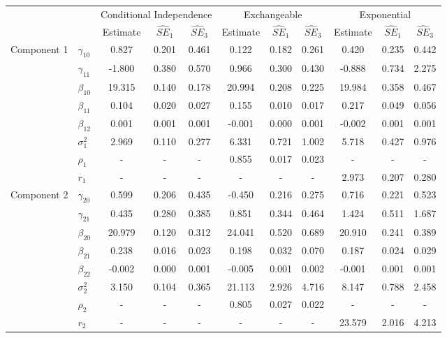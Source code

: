 \begin{table}[ht]
\begin{center}
\begin{tabular}{llccccccccc}
  \hline&&\multicolumn{3}{c}{Conditional Independence}&\multicolumn{3}{c}{Exchangeable}&\multicolumn{3}{c}{Exponential}\\&&Estimate&$\widehat{SE}_1$&$\widehat{SE}_3$&Estimate&$\widehat{SE}_1$&$\widehat{SE}_3$&Estimate&$\widehat{SE}_1$&$\widehat{SE}_3$\\\hline Component 1 & $\gamma_{10}$ & 0.827 & 0.201 & 0.461 & 0.122 & 0.182 & 0.261 & 0.420 & 0.235 & 0.442 \\ 
    & $\gamma_{11}$ & -1.800 & 0.380 & 0.570 & 0.966 & 0.300 & 0.430 & -0.888 & 0.734 & 2.275 \\ 
    & $\beta_{10}$ & 19.315 & 0.140 & 0.178 & 20.994 & 0.208 & 0.225 & 19.984 & 0.358 & 0.467 \\ 
    & $\beta_{11}$ & 0.104 & 0.020 & 0.027 & 0.155 & 0.010 & 0.017 & 0.217 & 0.049 & 0.056 \\ 
    & $\beta_{12}$ & 0.001 & 0.001 & 0.001 & -0.001 & 0.000 & 0.001 & -0.002 & 0.001 & 0.001 \\ 
    & $\sigma_1^2$ & 2.969 & 0.110 & 0.277 & 6.331 & 0.721 & 1.002 & 5.718 & 0.427 & 0.976 \\ 
    & $\rho_1$ & - & - & - & 0.855 & 0.017 & 0.023 & - & - & - \\ 
    & $r_1$ & - & - & - & - & - & - & 2.973 & 0.207 & 0.280 \\ 
  Component 2 & $\gamma_{20}$ & 0.599 & 0.206 & 0.435 & -0.450 & 0.216 & 0.275 & 0.716 & 0.221 & 0.523 \\ 
    & $\gamma_{21}$ & 0.435 & 0.280 & 0.385 & 0.851 & 0.344 & 0.464 & 1.424 & 0.511 & 1.687 \\ 
    & $\beta_{20}$ & 20.979 & 0.120 & 0.312 & 24.041 & 0.520 & 0.689 & 20.910 & 0.241 & 0.389 \\ 
    & $\beta_{21}$ & 0.238 & 0.016 & 0.023 & 0.198 & 0.032 & 0.070 & 0.187 & 0.024 & 0.029 \\ 
    & $\beta_{22}$ & -0.002 & 0.000 & 0.001 & -0.005 & 0.001 & 0.002 & -0.001 & 0.001 & 0.001 \\ 
    & $\sigma_2^2$ & 3.150 & 0.104 & 0.365 & 21.113 & 2.926 & 4.716 & 8.147 & 0.788 & 2.458 \\ 
    & $\rho_2$ & - & - & - & 0.805 & 0.027 & 0.022 & - & - & - \\ 
    & $r_2$ & - & - & - & - & - & - & 23.579 & 2.016 & 4.213 \\ 

\end{tabular}
\end{center}
\end{table}
